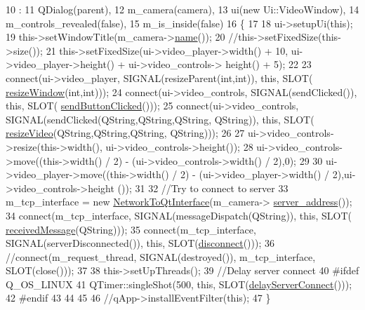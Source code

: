 \begin{DoxyCode}
10                                                         :
11     QDialog(parent),
12     m\_camera(camera),
13     ui(\textcolor{keyword}{new} Ui::VideoWindow),
14     m\_controls\_revealed(\textcolor{keyword}{false}),
15     m\_is\_inside(\textcolor{keyword}{false})
16 \{   
17 
18     ui->setupUi(\textcolor{keyword}{this});
19     this->setWindowTitle(m\_camera->\hyperlink{classCamera_a5763757e8d6adb6437dde2502072a3b1}{name}());
20     \textcolor{comment}{//this->setFixedSize(this->size());}
21     this->setFixedSize(ui->video\_player->width() + 10, ui->video\_player->height() + ui->video\_controls->
      height() + 5);
22 
23     connect(ui->video\_player, SIGNAL(resizeParent(\textcolor{keywordtype}{int},\textcolor{keywordtype}{int})), \textcolor{keyword}{this}, SLOT(
      \hyperlink{classVideoWindow_a5035f10be178cfc311d637c19938a344}{resizeWindow}(\textcolor{keywordtype}{int},\textcolor{keywordtype}{int})));
24     connect(ui->video\_controls, SIGNAL(sendClicked()), \textcolor{keyword}{this}, SLOT(
      \hyperlink{classVideoWindow_a655194e6449c76e200135c88f8fafd7d}{sendButtonClicked}()));
25     connect(ui->video\_controls, SIGNAL(sendClicked(QString,QString,QString, QString)), \textcolor{keyword}{this}, SLOT(
      \hyperlink{classVideoWindow_ac07f4db8a805849174cb129134708fd4}{resizeVideo}(QString,QString,QString, QString)));
26 
27     ui->video\_controls->resize(this->width(), ui->video\_controls->height());
28     ui->video\_controls->move((this->width() / 2) - (ui->video\_controls->width() / 2),0);
29 
30     ui->video\_player->move((this->width() / 2) - (ui->video\_player->width() / 2),ui->video\_controls->height
      ());
31 
32     \textcolor{comment}{//Try to connect to server}
33     m\_tcp\_interface = \textcolor{keyword}{new} \hyperlink{classNetworkToQtInterface}{NetworkToQtInterface}(m\_camera->
      \hyperlink{classCamera_aa93654bec9b65adfb95e192ac9c71e80}{server\_address}());
34     connect(m\_tcp\_interface, SIGNAL(messageDispatch(QString)), \textcolor{keyword}{this}, SLOT(
      \hyperlink{classVideoWindow_ab25ad37e9dfdb92f46212d4309d4232f}{receivedMessage}(QString)));
35     connect(m\_tcp\_interface, SIGNAL(serverDisconnected()), \textcolor{keyword}{this}, SLOT(\hyperlink{classVideoWindow_a68b4f26c999360c30b12cc70347393c7}{disconnect}()));
36     \textcolor{comment}{//connect(m\_request\_thread, SIGNAL(destroyed()), m\_tcp\_interface, SLOT(close()));}
37 
38     this->setUpThreads();
39     \textcolor{comment}{//Delay server connect}
40 \textcolor{preprocessor}{#ifdef Q\_OS\_LINUX}
41 \textcolor{preprocessor}{}    QTimer::singleShot(500, \textcolor{keyword}{this}, SLOT(\hyperlink{classVideoWindow_a55220de4b6b3b8e2575201c933932059}{delayServerConnect}()));
42 \textcolor{preprocessor}{#endif}
43 \textcolor{preprocessor}{}
44 
45 
46     \textcolor{comment}{//qApp->installEventFilter(this);}
47 \}
\end{DoxyCode}
